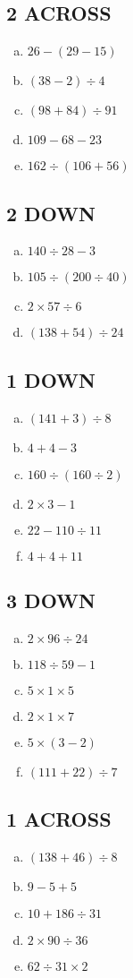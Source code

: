 \documentclass{exam}
\begin{document}
\begin{multicols*}{3}
\subsection*{2 ACROSS}
\begin{enumerate}[a)]
\item $26 - \left(29 - 15\right)$
\item $\left(38 - 2\right) \div 4$
\item $\left(98 + 84\right) \div 91$
\item $109 - 68 - 23$
\item $162 \div \left(106 + 56\right)$
\end{enumerate}
\subsection*{2 DOWN}
\begin{enumerate}[a)]
\item $140 \div 28 - 3$
\item $105 \div \left(200 \div 40\right)$
\item $2 \times 57 \div 6$
\item $\left(138 + 54\right) \div 24$
\end{enumerate}
\subsection*{1 DOWN}
\begin{enumerate}[a)]
\item $\left(141 + 3\right) \div 8$
\item $4 + 4 - 3$
\item $160 \div \left(160 \div 2\right)$
\item $2 \times 3 - 1$
\item $22 - 110 \div 11$
\item $4 + 4 + 11$
\end{enumerate}
\subsection*{3 DOWN}
\begin{enumerate}[a)]
\item $2 \times 96 \div 24$
\item $118 \div 59 - 1$
\item $5 \times 1 \times 5$
\item $2 \times 1 \times 7$
\item $5 \times \left(3 - 2\right)$
\item $\left(111 + 22\right) \div 7$
\end{enumerate}
\subsection*{1 ACROSS}
\begin{enumerate}[a)]
\item $\left(138 + 46\right) \div 8$
\item $9 - 5 + 5$
\item $10 + 186 \div 31$
\item $2 \times 90 \div 36$
\item $62 \div 31 \times 2$
\end{enumerate}
\end{multicols*}
\end{document}
